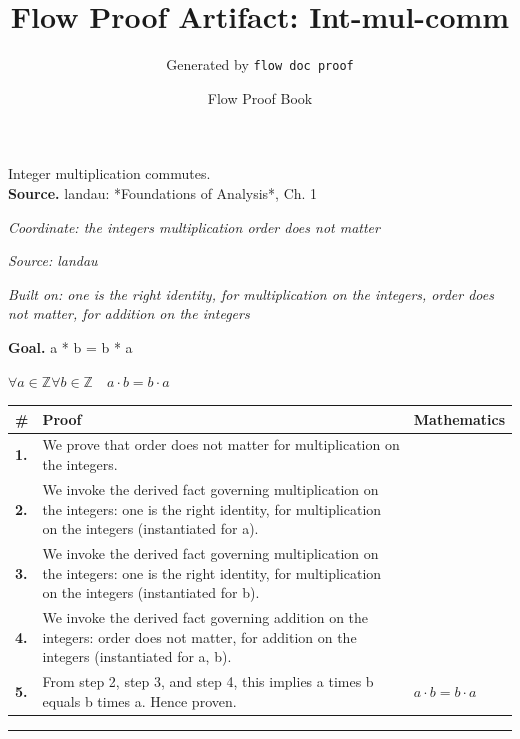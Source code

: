 \documentclass[11pt]{article}
\title{Flow Proof Artifact: Int-mul-comm}
\author{Generated by \texttt{flow doc proof}}
\date{Flow Proof Book}
\theoremstyle{definition}
\begin{document}
\maketitle
Integer multiplication commutes.\\[0.5em]
\textbf{Source.} landau: *Foundations of Analysis*, Ch. 1\\[0.5em]
\bigskip
{}\par
\smallskip\noindent\textit{Coordinate: the integers \cdot multiplication \cdot order does not matter}\par
\smallskip\noindent\textit{Source: landau}\par
\smallskip\noindent\textit{Built on: one is the right identity, for multiplication on the integers, order does not matter, for addition on the integers}\par
\medskip
\noindent\textbf{Goal.} a * b = b * a\par
\noindent$\displaystyle \forall a \in \mathbb{Z} \forall b \in \mathbb{Z}\quad a \cdot b = b \cdot a$\par
\medskip
\noindent
\begin{tabular}{@{} >{\raggedright\arraybackslash}p{} >{\raggedright\arraybackslash}p{} >{\raggedleft\arraybackslash}p{} @{}}
\textbf{\#} & \textbf{Proof} & \textbf{Mathematics} \\
\midrule
\textbf{1.} & We prove that order does not matter for multiplication on the integers. & \\[0.45em]
\textbf{2.} & We invoke the derived fact governing multiplication on the integers: one is the right identity, for multiplication on the integers (instantiated for a). & \\[0.45em]
\textbf{3.} & We invoke the derived fact governing multiplication on the integers: one is the right identity, for multiplication on the integers (instantiated for b). & \\[0.45em]
\textbf{4.} & We invoke the derived fact governing addition on the integers: order does not matter, for addition on the integers (instantiated for a, b). & \\[0.45em]
\textbf{5.} & From step 2, step 3, and step 4, this implies a times b equals b times a. Hence proven. & $\displaystyle a \cdot b = b \cdot a$ \\[0.45em]
\bottomrule
\end{tabular}
\label{thm:Int-multiplication-order_does_not_matter}
\par\medskip\hrule
\end{document}
